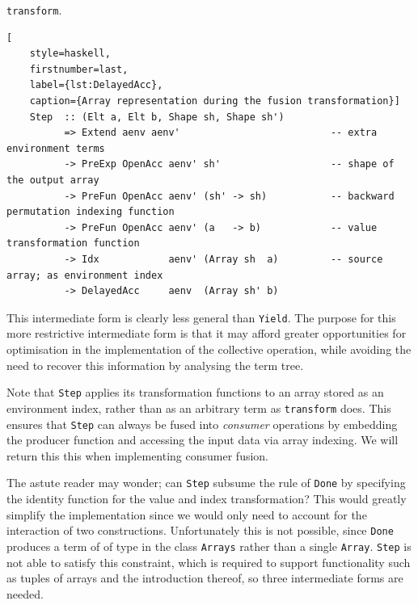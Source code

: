 \texttt{transform}.
%
\begin{lstlisting}[
    style=haskell,
    firstnumber=last,
    label={lst:DelayedAcc},
    caption={Array representation during the fusion transformation}]
    Step  :: (Elt a, Elt b, Shape sh, Shape sh')
          => Extend aenv aenv'                          -- extra environment terms
          -> PreExp OpenAcc aenv' sh'                   -- shape of the output array
          -> PreFun OpenAcc aenv' (sh' -> sh)           -- backward permutation indexing function
          -> PreFun OpenAcc aenv' (a   -> b)            -- value transformation function
          -> Idx            aenv' (Array sh  a)         -- source array; as environment index
          -> DelayedAcc     aenv  (Array sh' b)
\end{lstlisting}
%
This intermediate form is clearly less general than \texttt{Yield}. The purpose
for this more restrictive intermediate form is that it may afford greater
opportunities for optimisation in the implementation of the collective
operation, while avoiding the need to recover this information by analysing the
term tree.

Note that \texttt{Step} applies its transformation functions to an array stored
as an environment index, rather than as an arbitrary term as \texttt{transform}
does. This ensures that \texttt{Step} can always be fused into \emph{consumer}
operations by embedding the producer function and accessing the input data via
array indexing. We will return this this when implementing consumer fusion.

The astute reader may wonder; can \texttt{Step} subsume the rule of
\texttt{Done} by specifying the identity function for the value and index
transformation? This would greatly simplify the implementation since we would
only need to account for the interaction of two constructions. Unfortunately
this is not possible, since \texttt{Done} produces a term of of type in the
class \texttt{Arrays} rather than a single \texttt{Array}. \texttt{Step} is not
able to satisfy this constraint, which is required to support functionality such
as tuples of arrays and the introduction thereof, so three intermediate forms
are needed.

